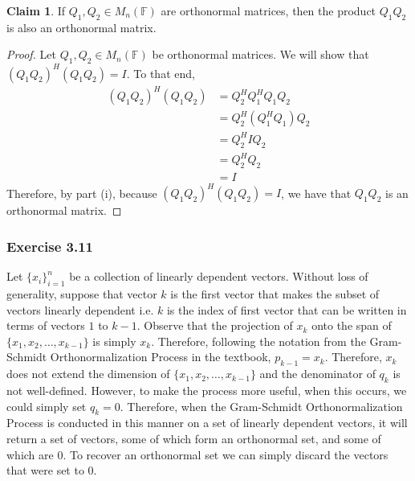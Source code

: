 \documentclass[letterpaper,12pt]{article}
\theoremstyle{definition}
\newtheorem{claim}[theorem]{Claim}
\begin{document}
\begin{claim}
If $Q_1, Q_2 \in M_n (\mathbb{F})$ are orthonormal matrices, then the product $Q_1 Q_2$ is also an orthonormal matrix.
\end{claim}
\begin{proof}
	Let $Q_1, Q_2 \in M_n (\mathbb{F})$ be orthonormal matrices. We will show that $(Q_1Q_2)^H (Q_1 Q_2) = I$. To that end,
	\begin{align*}
	(Q_1 Q_2)^H (Q_1 Q_2) &= Q_2^H Q_1^H  Q_1 Q_2 \\
	&= Q_2^H (Q_1^H  Q_1) Q_2 \\
	&= Q_2^H I Q_2 \tag{$Q_1^H  Q_1 = I$ because $Q_1$ is orthonormal} \\
	&= Q_2^H Q_2 \\
	&= I \tag{$Q_2^H  Q_2 = I$ because $Q_2$ is orthonormal}
	\end{align*}
	Therefore, by part (i), because $(Q_1Q_2)^H (Q_1 Q_2) = I$, we have that $Q_1 Q_2$ is an orthonormal matrix.
\end{proof}

\subsubsection*{Exercise 3.11}
Let $\{x_i\}_{i=1}^{n}$ be a collection of linearly dependent vectors. Without loss of generality, suppose that vector $k$ is the first vector that makes the subset of vectors linearly dependent i.e. $k$ is the index of first vector that can be written in terms of vectors $1$ to $k-1$.  Observe that the projection of $x_k$ onto the span of $\{x_1, x_2, \ldots, x_{k-1}\}$ is simply $x_k$. Therefore, following the notation from the Gram-Schmidt Orthonormalization Process in the textbook, $p_{k-1} = x_k$. Therefore, $x_k$ does not extend the dimension of $\{x_1, x_2, \ldots, x_{k-1}\}$ and the denominator of  $q_k$ is not well-defined. However, to make the process more useful, when this occurs, we could simply set $q_k = 0$. Therefore, when the Gram-Schmidt Orthonormalization Process is conducted in this manner on a set of linearly dependent vectors, it will return a set of vectors, some of which form an orthonormal set, and some of which are 0. To recover an orthonormal set we can simply discard the vectors that were set to 0.
\end{document}
